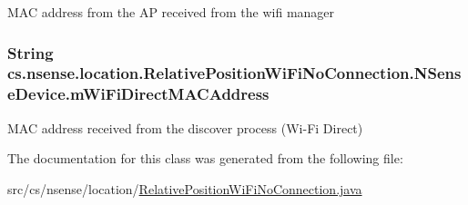 M\-A\-C address from the A\-P received from the wifi manager \hypertarget{classcs_1_1nsense_1_1location_1_1_relative_position_wi_fi_no_connection_1_1_n_sense_device_aa5f006f0eb7d96f17d0898bca82d6e37}{
\subsubsection[{m\-Wi\-Fi\-Direct\-M\-A\-C\-Address}]{\setlength{\rightskip}{0pt plus 5cm}String cs.\-nsense.\-location.\-Relative\-Position\-Wi\-Fi\-No\-Connection.\-N\-Sense\-Device.\-m\-Wi\-Fi\-Direct\-M\-A\-C\-Address}}\label{classcs_1_1nsense_1_1location_1_1_relative_position_wi_fi_no_connection_1_1_n_sense_device_aa5f006f0eb7d96f17d0898bca82d6e37}
M\-A\-C address received from the discover process (Wi-\/\-Fi Direct) 

The documentation for this class was generated from the following file\-:\begin{DoxyCompactItemize}
\item 
src/cs/nsense/location/\hyperlink{_relative_position_wi_fi_no_connection_8java}{Relative\-Position\-Wi\-Fi\-No\-Connection.\-java}\end{DoxyCompactItemize}
